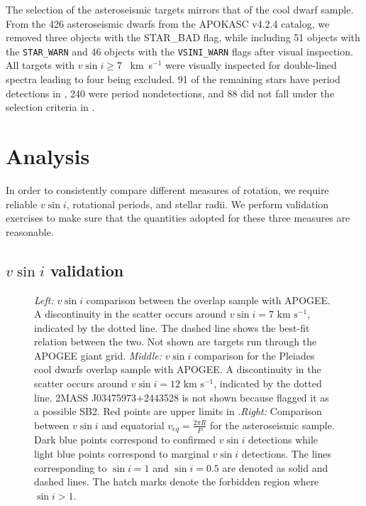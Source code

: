 \documentclass[manuscript]{aastex6}
\newcommand{\vsini}{\ensuremath{v \sin i}}
\newcommand{\kms}{\textrm{~km~s}\ensuremath{^{-1}}}
\newcommand{\STARWARN}{\texttt{STAR\_WARN}}
\newcommand{\VSINIWARN}{\texttt{VSINI\_WARN}}
\begin{document}
The selection of the asteroseismic targets mirrors that of the cool dwarf
sample. From the 426 asteroseismic dwarfs from the APOKASC v4.2.4 catalog, we 
removed three objects with the STAR\_BAD flag, while including 51 objects with 
the \STARWARN{} and 46 objects with the \VSINIWARN{} flags after visual 
inspection. All targets with \(\vsini \ge 7\) \kms{} were visually
inspected for double-lined spectra leading to four being excluded. 91 of 
the remaining stars have period detections in \citet{McQuillan14}, 240 were 
period nondetections, and 88 did not fall under the selection criteria in 
\citet{McQuillan14}. 

\section{Analysis}
\label{sec:analysis}

In order to consistently compare different measures of rotation, we require 
reliable \vsini{}, rotational periods, and stellar radii. We perform validation
exercises to make sure that the quantities adopted for these three measures are 
reasonable.


\subsection{\vsini{} validation}
\label{sec:vsini_check}

\begin{figure*}
    \caption{\emph{Left:} \vsini{} comparison between the \citet{Bruntt12}
        overlap sample with APOGEE\@. A discontinuity in the scatter occurs
        around \(\vsini = 7 \kms\), indicated by the dotted line. The dashed
    line shows the best-fit relation between the two. Not shown are targets 
    run through the APOGEE giant grid. \emph{Middle:} \vsini{} comparison for 
    the Pleiades cool dwarfs \citep{Stauffer87} overlap sample with APOGEE\@. 
    A discontinuity in the scatter occurs around \(\vsini = 12 \kms\), 
    indicated by the dotted line. 2MASS J03475973+2443528 is not shown
    because \citet{Stauffer87} flagged it as a possible SB2. Red points are 
    upper limits in \citet{Stauffer87}.\emph{Right:} Comparison between
    \vsini{} and equatorial \(v_{eq} = \frac{2\pi R}{P}\) for the 
    asteroseismic sample. Dark blue points correspond to confirmed
    \vsini{} detections while light blue points correspond to marginal
    \vsini{} detections. The lines corresponding to \(\sin i = 1\) and
    \(\sin i = 0.5\) are denoted as solid and dashed lines. The hatch
    marks denote the forbidden region where \(\sin i > 1\).\label{fig:comps}}
\end{figure*}
\end{document}
